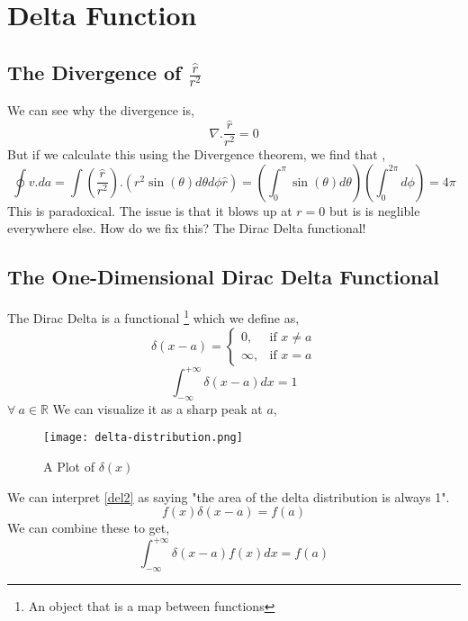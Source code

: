 \section{Delta Function}
\subsection{The Divergence of $\frac{\hat{r}}{r^{2}}$}
We can see why the divergence is,
\begin{equation}
\nabla . \frac{\hat{r}}{r^{2}} = 0
\end{equation}
But if we calculate this using the Divergence theorem, we find that ,
\begin{equation}
	\oint v .da = \int \left( \frac{\hat{r}}{r^{2}} \right) . \left( r^{2} \sin(\theta) d \theta d \phi \hat{r} \right) = \left( \int_{0}^{\pi} \sin(\theta) d \theta \right) \left( \int_{0}^{2\pi} d \phi \right) = 4 \pi
\end{equation}
This is paradoxical. The issue is that it blows up at $r=0$ but is is neglible everywhere else. How do we fix this? The Dirac Delta functional!
\subsection{The One-Dimensional Dirac Delta Functional}
The Dirac Delta is a functional \footnote{An object that is a map between functions} which we define as,
\begin{equation} \label{deltadef}
\delta(x-a)= 
\begin{cases}
0, & \text{if } x \neq a\\
\infty,              & \text{if } x = a
\end{cases}
\end{equation}
\begin{equation}
\int_{- \infty}^{+ \infty} \delta(x-a) dx = 1
\label{del2}
\end{equation}
$\forall \  a \in \mathbb{R}$
We can visualize it as a sharp peak at $a$,
\begin{figure}
	\centering
	\texttt{[image: delta-distribution.png]}
	\caption{A Plot of $\delta(x)$}
\end{figure}
We can interpret \ref{del2} as saying "the area of the delta distribution is always 1".
\begin{equation}
f(x)\delta(x - a ) = f(a)
\end{equation}
We can combine these to get,
\begin{equation}
\int_{- \infty}^{+ \infty} \delta(x-a) f(x) dx = f(a)
\end{equation}
